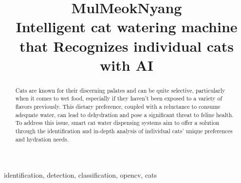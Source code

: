 \documentclass[conference]{IEEEtran}
\begin{document}
\title{MulMeokNyang\\
{\footnotesize \textsuperscript{}Intelligent cat watering machine that Recognizes individual cats with AI}
}

\author{
\and
{}
\and
{}
\and
{}
}

\maketitle

\begin{abstract}
Cats are known for their discerning palates and can be quite selective, particularly when it comes to wet food, especially if they haven't been exposed to a variety of flavors previously. This dietary preference, coupled with a reluctance to consume adequate water, can lead to dehydration and pose a significant threat to feline health. To address this issue, smart cat water dispensing systems aim to offer a solution through the identification and in-depth analysis of individual cats' unique preferences and hydration needs.
\end{abstract}

\begin{IEEEkeywords}
identification, detection, classification, opencv, cats
\end{IEEEkeywords}
\end{document}
